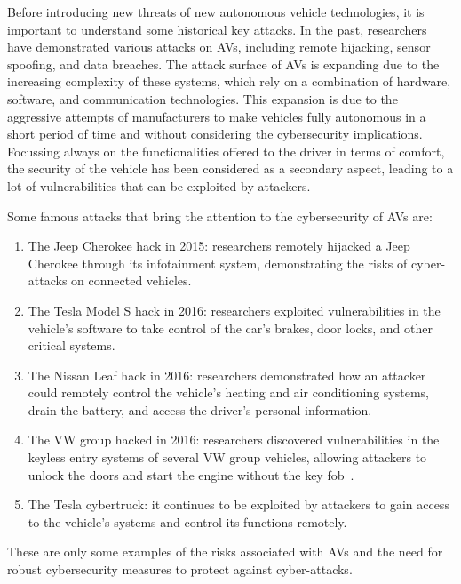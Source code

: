 Before introducing new threats of new autonomous vehicle technologies, it is important to understand some historical key attacks.
In the past, researchers have demonstrated various attacks on AVs, including remote hijacking, sensor spoofing, and data breaches.
The attack surface of AVs is expanding due to the increasing complexity of these systems, which rely on a combination of hardware, software, and communication technologies\cite{cybersec}.
This expansion is due to the aggressive attempts of manufacturers to
make vehicles fully autonomous in a short period of time and without considering the cybersecurity implications.
Focussing always on the functionalities offered to the driver in terms of comfort, the security of the vehicle has been considered as a secondary aspect, leading to a lot of vulnerabilities that can be exploited by attackers.

Some famous attacks that bring the attention to the cybersecurity of AVs are:
\begin{enumerate}
    \item The Jeep Cherokee hack in 2015: researchers remotely hijacked a Jeep Cherokee through its infotainment system, demonstrating the risks of cyber-attacks on connected vehicles\cite{miller2015remote}.
    \item The Tesla Model S hack in 2016: researchers exploited vulnerabilities in the vehicle's software to take control of the car's brakes, door locks, and other critical systems\cite{tesla_hack}.
    \item The Nissan Leaf hack in 2016: researchers demonstrated how an attacker could remotely control the vehicle's heating and air conditioning systems, drain the battery, and access the driver's personal information.
    \item The VW group hacked in 2016: researchers discovered vulnerabilities in the keyless entry systems of several VW group vehicles, allowing attackers to unlock the doors and start the engine without the key fob~\cite{garcia2016lock}.
    \item The Tesla cybertruck: it continues to be exploited by attackers to gain access to the vehicle's systems and control its functions remotely.
\end{enumerate}

These are only some examples of the risks associated with AVs and the need for robust cybersecurity measures to protect against cyber-attacks.